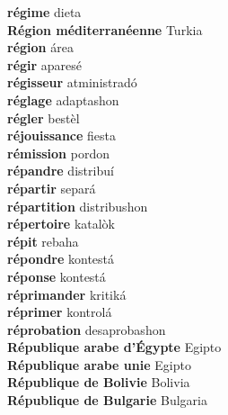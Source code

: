 \textbf{ régime  } dieta \\
\textbf{ Région méditerranéenne  } Turkia \\
\textbf{ région  } área \\
\textbf{ régir  } aparesé \\
\textbf{ régisseur  } atministradó \\
\textbf{ réglage  } adaptashon \\
\textbf{ régler  } bestèl \\
\textbf{ réjouissance  } fiesta \\
\textbf{ rémission  } pordon \\
\textbf{ répandre  } distribuí \\
\textbf{ répartir  } separá \\
\textbf{ répartition  } distribushon \\
\textbf{ répertoire  } katalòk \\
\textbf{ répit  } rebaha \\
\textbf{ répondre  } kontestá \\
\textbf{ réponse  } kontestá \\
\textbf{ réprimander  } kritiká \\
\textbf{ réprimer  } kontrolá \\
\textbf{ réprobation  } desaprobashon \\
\textbf{ République arabe d’Égypte  } Egipto \\
\textbf{ République arabe unie  } Egipto \\
\textbf{ République de Bolivie  } Bolivia \\
\textbf{ République de Bulgarie  } Bulgaria \\
